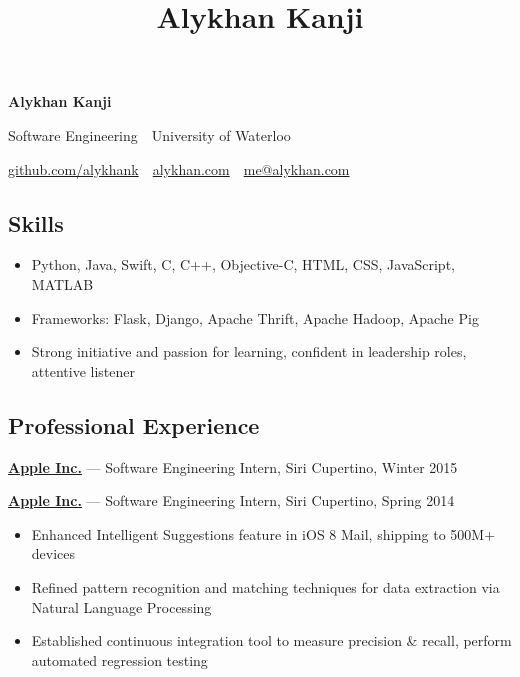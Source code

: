 \documentclass[pdftex,11pt,letterpaper]{article}
\title{Alykhan Kanji}
\begin{document}
\font

\begin{center}
  {\Huge \textbf{Alykhan Kanji}}

  {\large
    Software Engineering\ \textperiodcentered \ University of Waterloo

    \href{https://github.com/alykhank}{github.com/alykhank}\ \textperiodcentered \ \href{http://alykhan.com}{alykhan.com}\ \textperiodcentered \ \href{mailto:me@alykhan.com}{me@alykhan.com}
  }
\end{center}

\subsection*{Skills}

\begin{itemize}[before=,after=]
  \item Python, Java, Swift, C, C++, Objective-C, HTML, CSS, JavaScript, MATLAB
  \item Frameworks: Flask, Django, Apache Thrift, Apache Hadoop, Apache Pig
  \item Strong initiative and passion for learning, confident in leadership roles, attentive listener
\end{itemize}

\subsection*{Professional Experience}

\href{http://apple.com}{\textbf{Apple Inc.}} --- Software Engineering Intern, Siri \hfill {\color{gray} Cupertino, Winter 2015}
\vspace{6mm}

\href{http://apple.com}{\textbf{Apple Inc.}} --- Software Engineering Intern, Siri \hfill {\color{gray} Cupertino, Spring 2014}
\begin{itemize}
  \item Enhanced Intelligent Suggestions feature in iOS 8 Mail, shipping to 500M+ devices
  \item Refined pattern recognition and matching techniques for data extraction via Natural Language Processing
  \item Established continuous integration tool to measure precision \& recall, perform automated regression testing
\end{itemize}
\end{document}
